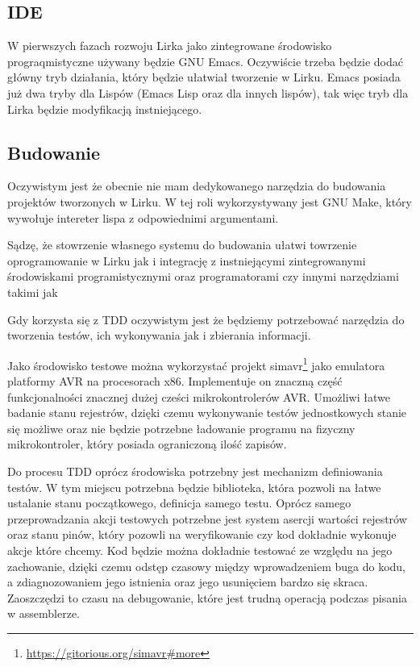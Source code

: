 \documentclass[11pt]{article}
\begin{document}
\subsection{IDE}
W pierwszych fazach rozwoju Lirka jako zintegrowane środowisko prograqmistyczne używany będzie GNU Emacs. 
Oczywiście trzeba będzie dodać główny tryb działania, który będzie ułatwiał tworzenie w Lirku.
Emacs posiada już dwa tryby dla Lispów (Emacs Lisp oraz dla innych lispów), tak więc tryb dla Lirka będzie modyfikacją instniejącego.
\subsection{Budowanie}
Oczywistym jest że obecnie nie mam dedykowanego narzędzia do budowania projektów tworzonych w  Lirku.
W tej roli wykorzystywany jest GNU Make, który wywołuje intereter lispa z odpowiednimi argumentami.

Sądzę, że stowrzenie własnego systemu do budowania ułatwi towrzenie oprogramowanie w Lirku 
jak i integrację z instniejącymi zintegrowanymi środowiskami programistycznymi oraz programatorami
czy innymi narzędziami takimi jak 

Gdy korzysta się z TDD oczywistym jest że będziemy potrzebować narzędzia do tworzenia testów, ich wykonywania jak i zbierania informacji.

Jako środowisko testowe można wykorzystać projekt simavr\footnote{\url{https://gitorious.org/simavr#more}} jako emulatora platformy AVR na procesorach x86. 
Implementuje on znaczną część funkcjonalności znacznej dużej cześci mikrokontrolerów AVR.
Umożliwi łatwe badanie stanu rejestrów, dzięki czemu wykonywanie testów jednostkowych stanie się możliwe oraz
nie będzie potrzebne ładowanie programu na fizyczny mikrokontroler, który posiada ograniczoną ilość zapisów.

Do procesu TDD oprócz środowiska potrzebny jest mechanizm definiowania testów.
W tym miejscu potrzebna będzie biblioteka, która pozwoli na łatwe ustalanie stanu początkowego,
definicja samego testu.
Oprócz samego przeprowadzania akcji testowych potrzebne jest system asercji wartości rejestrów oraz stanu pinów,
który pozowli na weryfikowanie czy kod dokładnie wykonuje akcje które chcemy.
Kod będzie można dokładnie testować ze względu na jego zachowanie,
dzięki czemu odstęp czasowy między wprowadzeniem buga do kodu,
a zdiagnozowaniem jego istnienia oraz jego usunięciem bardzo się skraca.
Zaoszczędzi to czasu na debugowanie, które jest trudną operacją podczas pisania w assemblerze.
\end{document}
